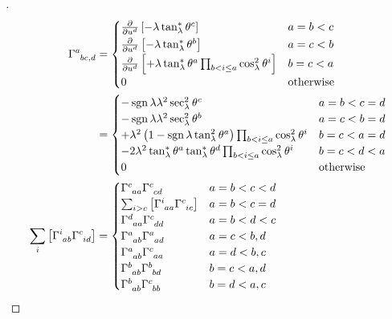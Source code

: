\documentclass[../main.tex]{subfiles}
\begin{document}
\begin{proof}[]
\begin{align*}
\tensor{\Gamma}{^a_b_c_{,d}}
&=\begin{cases}
\frac{\partial}{\partial\tensor{u}{^d}}\left[-\lambda\tan_\lambda^\ast\tensor{\theta}{^c}\right]&\text{$a=b<c$}\\
\frac{\partial}{\partial\tensor{u}{^d}}\left[-\lambda\tan_\lambda^\ast\tensor{\theta}{^b}\right]&\text{$a=c<b$}\\
\frac{\partial}{\partial\tensor{u}{^d}}\left[+\lambda\tan_\lambda^\ast\tensor{\theta}{^a}\prod_{b<i\le a}{\cos_\lambda^2\tensor{\theta}{^i}}\right]&\text{$b=c<a$}\\
0&\text{otherwise}\\
\end{cases}\\
&=\begin{cases}
-\sign{\lambda}\lambda^2\sec_\lambda^2\tensor{\theta}{^c}&\text{$a=b<c=d$}\\
-\sign{\lambda}\lambda^2\sec_\lambda^2\tensor{\theta}{^b}&\text{$a=c<b=d$}\\
+\lambda^2\left(1-\sign{\lambda}\tan_\lambda^2\tensor{\theta}{^a}\right)\prod_{b<i\le a}{\cos_\lambda^2\tensor{\theta}{^i}}&\text{$b=c<a=d$}\\
-2\lambda^2\tan_\lambda^\ast\tensor{\theta}{^a}\tan_\lambda^\ast\tensor{\theta}{^d}\prod_{b<i\le a}{\cos_\lambda^2\tensor{\theta}{^i}}&\text{$b=c<d<a$}\\
0&\text{otherwise}\\
\end{cases}\\
\sum_{i}\left[\tensor{\Gamma}{^i_a_b}\tensor{\Gamma}{^c_i_d}\right]
&=\begin{cases}
\tensor{\Gamma}{^c_a_a}\tensor{\Gamma}{^c_c_d}&\text{$a=b<c<d$}\\
\sum_{i>c}\left[\tensor{\Gamma}{^i_a_a}\tensor{\Gamma}{^c_i_c}\right]&\text{$a=b<c=d$}\\
\tensor{\Gamma}{^d_a_a}\tensor{\Gamma}{^c_d_d}&\text{$a=b<d<c$}\\
\tensor{\Gamma}{^a_a_b}\tensor{\Gamma}{^a_a_d}&\text{$a=c<b,d$}\\
\tensor{\Gamma}{^a_a_b}\tensor{\Gamma}{^c_a_a}&\text{$a=d<b,c$}\\
\tensor{\Gamma}{^b_a_b}\tensor{\Gamma}{^b_b_d}&\text{$b=c<a,d$}\\
\tensor{\Gamma}{^b_a_b}\tensor{\Gamma}{^c_b_b}&\text{$b=d<a,c$}\\

\end{cases}
\end{align*}
\end{proof}
\end{document}
